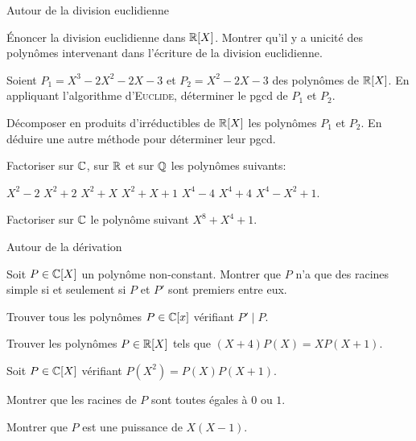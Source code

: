 \documentclass[french]{report}
\begin{document}
\begin{exo} Autour de la division euclidienne
    \begin{q}{1}
        Énoncer la division euclidienne dans \(\mathbb{R}[X]\). Montrer qu'il y a unicité des
        polynômes intervenant dans l'écriture de la division euclidienne.
    \end{q}
    \begin{q}{2}
        Soient \(P_1=X^3-2X^2-2X-3\) et \(P_2=X^2-2X-3\) des polynômes de \(\mathbb{R}[X]\).
        En appliquant l'algorithme d'\textsc{Euclide}, déterminer le pgcd de \(P_1\)
        et \(P_2\).
    \end{q}
    \begin{q}{3}
        Décomposer en produits d'irréductibles de \(\mathbb{R}[X]\) les polynômes
        \(P_1\) et \(P_2\). En déduire une autre méthode pour déterminer leur pgcd.
    \end{q}
\end{exo}

\begin{exo}
    Factoriser sur \(\mathbb{C}\), sur \(\mathbb{R}\)  et sur \(\mathbb{Q}\) les polynômes suivants:
    \begin{enumerate}
        \itt \(X^2-2\)
        \itt \(X^2+2\)
        \itt \(X^2+X\)
        \itt \(X^2+X+1\)
        \itt \(X^4-4\)
        \itt \(X^4+4\)
        \itt \(X^4-X^2+1\).
    \end{enumerate}
\end{exo}

\begin{exo}
    Factoriser sur \(\mathbb{C}\) le polynôme suivant \(X^8+X^4+1\).
\end{exo}

\begin{exo} Autour de la dérivation
    \begin{q}{1}
        Soit \(P\in\mathbb{C}[X]\) un polynôme non-constant. Montrer que \(P\) n'a que des racines
        simple si et seulement si \(P\) et \(P'\) sont premiers entre eux.
    \end{q}
    \begin{q}{2}
        Trouver tous les polynômes \(P\in \mathbb{C}[x]\) vérifiant \(P'\mid P\).
    \end{q}
\end{exo}

\begin{exo}
    Trouver les polynômes \(P\in\mathbb{R}[X]\) tels que \(\left(X+4\right)P(X)=XP(X+1)\).
\end{exo}

\begin{exo}
    Soit \(P\in\mathbb{C}[X]\) vérifiant \(P(X^2) = P(X)P(X+1)\).
    \begin{q}{1}
        Montrer que les racines de \(P\) sont toutes égales à \(0\) ou \(1\).
    \end{q}
    \begin{q}{2}
        Montrer que \(P\) est une puissance de \(X(X-1)\).
    \end{q}
\end{exo}
\end{document}
